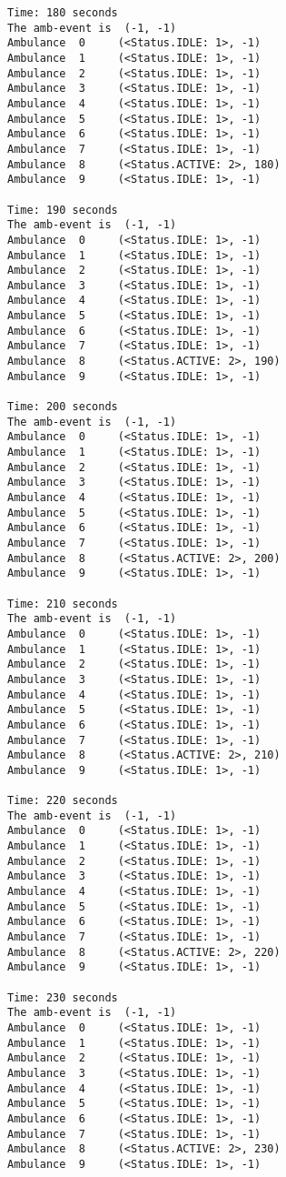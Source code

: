 \documentclass[11pt]{article}
\begin{document}
\begin{Verbatim}[commandchars=\\\{\}]
Time: 180 seconds
The amb-event is  (-1, -1)
Ambulance  0	 (<Status.IDLE: 1>, -1)
Ambulance  1	 (<Status.IDLE: 1>, -1)
Ambulance  2	 (<Status.IDLE: 1>, -1)
Ambulance  3	 (<Status.IDLE: 1>, -1)
Ambulance  4	 (<Status.IDLE: 1>, -1)
Ambulance  5	 (<Status.IDLE: 1>, -1)
Ambulance  6	 (<Status.IDLE: 1>, -1)
Ambulance  7	 (<Status.IDLE: 1>, -1)
Ambulance  8	 (<Status.ACTIVE: 2>, 180)
Ambulance  9	 (<Status.IDLE: 1>, -1)

Time: 190 seconds
The amb-event is  (-1, -1)
Ambulance  0	 (<Status.IDLE: 1>, -1)
Ambulance  1	 (<Status.IDLE: 1>, -1)
Ambulance  2	 (<Status.IDLE: 1>, -1)
Ambulance  3	 (<Status.IDLE: 1>, -1)
Ambulance  4	 (<Status.IDLE: 1>, -1)
Ambulance  5	 (<Status.IDLE: 1>, -1)
Ambulance  6	 (<Status.IDLE: 1>, -1)
Ambulance  7	 (<Status.IDLE: 1>, -1)
Ambulance  8	 (<Status.ACTIVE: 2>, 190)
Ambulance  9	 (<Status.IDLE: 1>, -1)

Time: 200 seconds
The amb-event is  (-1, -1)
Ambulance  0	 (<Status.IDLE: 1>, -1)
Ambulance  1	 (<Status.IDLE: 1>, -1)
Ambulance  2	 (<Status.IDLE: 1>, -1)
Ambulance  3	 (<Status.IDLE: 1>, -1)
Ambulance  4	 (<Status.IDLE: 1>, -1)
Ambulance  5	 (<Status.IDLE: 1>, -1)
Ambulance  6	 (<Status.IDLE: 1>, -1)
Ambulance  7	 (<Status.IDLE: 1>, -1)
Ambulance  8	 (<Status.ACTIVE: 2>, 200)
Ambulance  9	 (<Status.IDLE: 1>, -1)

Time: 210 seconds
The amb-event is  (-1, -1)
Ambulance  0	 (<Status.IDLE: 1>, -1)
Ambulance  1	 (<Status.IDLE: 1>, -1)
Ambulance  2	 (<Status.IDLE: 1>, -1)
Ambulance  3	 (<Status.IDLE: 1>, -1)
Ambulance  4	 (<Status.IDLE: 1>, -1)
Ambulance  5	 (<Status.IDLE: 1>, -1)
Ambulance  6	 (<Status.IDLE: 1>, -1)
Ambulance  7	 (<Status.IDLE: 1>, -1)
Ambulance  8	 (<Status.ACTIVE: 2>, 210)
Ambulance  9	 (<Status.IDLE: 1>, -1)

Time: 220 seconds
The amb-event is  (-1, -1)
Ambulance  0	 (<Status.IDLE: 1>, -1)
Ambulance  1	 (<Status.IDLE: 1>, -1)
Ambulance  2	 (<Status.IDLE: 1>, -1)
Ambulance  3	 (<Status.IDLE: 1>, -1)
Ambulance  4	 (<Status.IDLE: 1>, -1)
Ambulance  5	 (<Status.IDLE: 1>, -1)
Ambulance  6	 (<Status.IDLE: 1>, -1)
Ambulance  7	 (<Status.IDLE: 1>, -1)
Ambulance  8	 (<Status.ACTIVE: 2>, 220)
Ambulance  9	 (<Status.IDLE: 1>, -1)

Time: 230 seconds
The amb-event is  (-1, -1)
Ambulance  0	 (<Status.IDLE: 1>, -1)
Ambulance  1	 (<Status.IDLE: 1>, -1)
Ambulance  2	 (<Status.IDLE: 1>, -1)
Ambulance  3	 (<Status.IDLE: 1>, -1)
Ambulance  4	 (<Status.IDLE: 1>, -1)
Ambulance  5	 (<Status.IDLE: 1>, -1)
Ambulance  6	 (<Status.IDLE: 1>, -1)
Ambulance  7	 (<Status.IDLE: 1>, -1)
Ambulance  8	 (<Status.ACTIVE: 2>, 230)
Ambulance  9	 (<Status.IDLE: 1>, -1)


\end{Verbatim}
\end{document}

